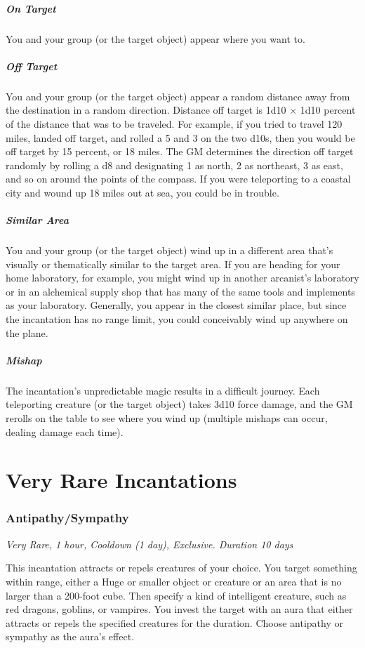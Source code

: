 \subparagraph*{On Target} You and your group (or the target object) appear where you want to.

\subparagraph*{Off Target} You and your group (or the target object) appear a random distance away from the destination in a random direction. Distance off target is 1d10 × 1d10 percent of the distance that was to be traveled. For example, if you tried to travel 120 miles, landed off target, and rolled a 5 and 3 on the two d10s, then you would be off target by 15 percent, or 18 miles. The GM determines the direction off target randomly by rolling a d8 and designating 1 as north, 2 as northeast, 3 as east, and so on around the points of the compass. If you were teleporting to a coastal city and wound up 18 miles out at sea, you could be in trouble.

\subparagraph*{Similar Area} You and your group (or the target object) wind up in a different area that's visually or thematically similar to the target area. If you are heading for your home laboratory, for example, you might wind up in another arcanist's laboratory or in an alchemical supply shop that has many of the same tools and implements as your laboratory. Generally, you appear in the closest similar place, but since the incantation has no range limit, you could conceivably wind up anywhere on the plane.

\subparagraph*{Mishap} The incantation's unpredictable magic results in a difficult journey. Each teleporting creature (or the target object) takes 3d10 force damage, and the GM rerolls on the table to see where you wind up (multiple mishaps can occur, dealing damage each time).

\section{Very Rare Incantations}

\subsubsection{Antipathy/Sympathy}
\textit{Very Rare, 1 hour, Cooldown (1 day), Exclusive. Duration 10 days}

This incantation attracts or repels creatures of your choice. You target something within range, either a Huge or smaller object or creature or an area that is no larger than a 200-foot cube. Then specify a kind of intelligent creature, such as red dragons, goblins, or vampires. You invest the target with an aura that either attracts or repels the specified creatures for the duration. Choose antipathy or sympathy as the aura's effect.

